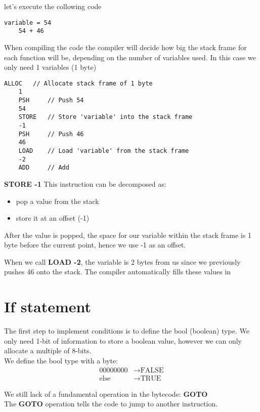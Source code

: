 \documentclass{article}
\begin{document}
let's execute the collowing code

\begin{lstlisting}[style=generic]
    variable = 54
    54 + 46
\end{lstlisting}

When compiling the code the compiler will decide how big the stack frame for each function will be,
depending on the number of variables used. In this case we only need 1 variables (1 byte)

\begin{lstlisting}[style=generic]
    ALLOC   // Allocate stack frame of 1 byte
    1
    PSH     // Push 54
    54
    STORE   // Store 'variable' into the stack frame
    -1
    PSH     // Push 46
    46
    LOAD    // Load 'variable' from the stack frame
    -2
    ADD     // Add
\end{lstlisting}

\textbf{STORE -1}
This instruction can be decomposed as:

\begin{itemize}
    \item pop a value from the stack
    \item store it at an offset (-1)
\end{itemize}

After the value is popped, the space for our variable within the stack frame is 1 byte before the current point,
hence we use -1 as an offset.

When we call \textbf{LOAD -2}, the variable is 2 bytes from us since we previously pushes 46 onto the stack.
The compiler automatically fills these values in

\section{If statement}

The first step to implement conditions is to define the bool (boolean) type. We only need 1-bit of information
to store a boolean value, however we can only allocate a multiple of 8-bits.
\\
We define the bool type with a byte:
\begin{align*}
    00000000 &\rightarrow \text{FALSE} \\
    \text{else} &\rightarrow \text{TRUE}
\end{align*}

We still lack of a fundamental operation in the bytecode: \textbf{GOTO}
\\
The \textbf{GOTO} operation tells the code to jump to another instruction.
\end{document}
